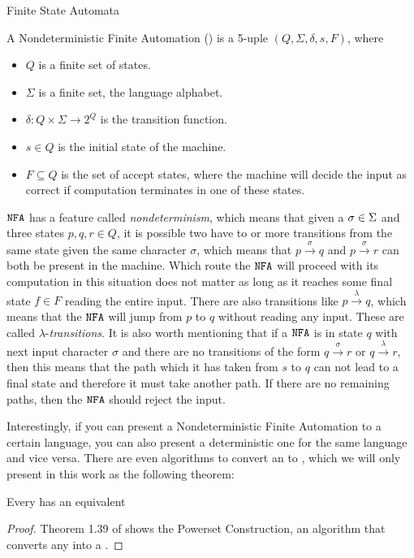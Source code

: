 \begin{section}{Finite State Automata}
\begin{definition}
A Nondeterministic Finite Automation () is a 5-uple
$(Q, \Sigma, \delta, s, F)$, where
\begin{itemize}

\item $Q$ is a finite set of states.
\item $\Sigma$ is a finite set, the language alphabet.
\item $\delta:Q\times\Sigma \longrightarrow 2^Q$ is the transition function.
\item $s \in Q$ is the initial state of the machine.
\item $F \subseteq Q$ is the set of accept states, where the machine will
decide the input as correct if computation terminates in one of these
states.
\end{itemize}
\end{definition}

$\texttt{NFA}$ has a feature called \textit{nondeterminism}, which means that given a
$\sigma \in \Sigma$ and three states $p, q, r \in Q$, it is possible two have to
or more transitions from the same state given the same character $\sigma$,
which means that $p \overset{\sigma}{\longrightarrow} q$ and $p
\overset{\sigma}{\longrightarrow} r$ can both be present in the machine. Which
route the $\texttt{NFA}$ will proceed with its computation in this situation does not
matter as long as it reaches some final state $f \in F$ reading the entire
input. There are also transitions like $p \overset{\lambda}{\longrightarrow}
q$, which means that the $\texttt{NFA}$ will jump from $p$ to $q$ without reading any
input. These are called $\lambda$-\textit{transitions}. It is also worth
mentioning that if a $\texttt{NFA}$ is in state $q$ with next input character $\sigma$
and there are no transitions of the form $q \overset{\sigma}{\longrightarrow}
r$ or $q \overset{\lambda}{\longrightarrow} r$, then this means that the path
which it has taken from $s$ to $q$ can not lead to a final state and therefore
it must take another path. If there are no remaining paths, then the $\texttt{NFA}$
should reject the input.

Interestingly, if you can present a Nondeterministic Finite Automation to a
certain language, you can also present a deterministic one for the same
language and vice versa. There are even algorithms to convert an  to
, which we will only present in this work as the following
theorem:

\begin{theorem}\label{nfa_to_dfa}
Every  has an equivalent 
\end{theorem}
\begin{proof}
	Theorem 1.39 of \citep{sipser2012} shows the Powerset Construction, an algorithm
	that converts any  into a .
\end{proof}


\end{section}
